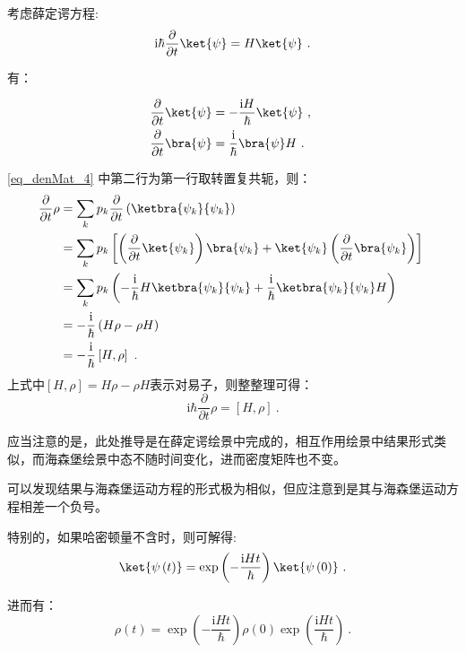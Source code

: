     考虑薛定谔方程:
    $$\mathrm{i}\hbar\frac{\partial}{\partial t} \ket{\psi} = H \ket{\psi}~.$$

    有：

    \begin{equation}\label{eq_denMat_4}
    \begin{aligned}
    \frac{\partial}{\partial t}\ket{\psi} &= -\frac{\mathrm{i}H}{\hbar}\ket{\psi}~, \\
    \frac{\partial}{\partial t}\bra{\psi} &= \frac{\mathrm{i}}{\hbar}\bra{\psi}H~.
    \end{aligned}~
    \end{equation}

    \autoref{eq_denMat_4} 中第二行为第一行取转置复共轭，则：
    \begin{equation}\label{eq_denMat_2}
    \begin{aligned}
    \frac{\partial}{\partial t}\rho &= \sum\limits_kp_k\frac{\partial}{\partial t}\left( \ketbra{\psi_k}{\psi_k} \right) \\
    &= \sum\limits_k p_k\left[ \left(\frac{\partial}{\partial t}\ket{\psi_k}\right)\bra{\psi_k} + \ket{\psi_k}\left(\frac{\partial}{\partial t}\bra{\psi_k}\right)\right] \\ 
    &= \sum\limits_k p_k \left( -\frac{\mathrm{i}}{\hbar}H\ketbra{\psi_k}{\psi_k} + \frac{\mathrm{i}}{\hbar}\ketbra{\psi_k}{\psi_k}H \right) \\
    &=-\frac{\mathrm{i}}{\hbar}\left(  H\rho -  \rho H\right) \\
    &= -\frac{\mathrm{i}}{\hbar}\left[ H, \rho \right]~.
    \end{aligned}~
    \end{equation}
    上式中$\left[ H, \rho \right] = H\rho -  \rho H$表示对易子，则整整理可得：
    \begin{equation}\label{eq_denMat_5}
    \mathrm{i}\hbar \frac{\partial}{\partial t} \rho= \left[ H, \rho \right]~.
    \end{equation}

    应当注意的是，此处推导是在薛定谔绘景中完成的，相互作用绘景中结果形式类似，而海森堡绘景中态不随时间变化，进而密度矩阵也不变。

    可以发现结果与海森堡运动方程的形式极为相似，但应注意到是其与海森堡运动方程相差一个负号。

    特别的，如果哈密顿量不含时，则可解得:
    $$\ket{\psi\left( t\right)} = \exp\left(-\frac{\mathrm{i}Ht}{\hbar}\right)\ket{\psi\left(0\right)}~.$$

    进而有：
    \begin{equation}\label{eq_denMat_6}
    \rho \left( t \right) = \exp\left(-\frac{\mathrm{i}Ht}{\hbar}\right) \rho \left(0\right) \exp\left(\frac{\mathrm{i}Ht}{\hbar}\right)~.
    \end{equation}
    
